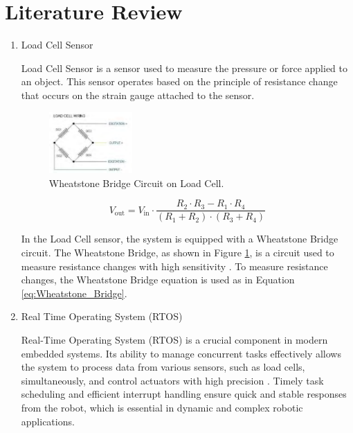 \section{Literature Review}
\label{sec:literaturereview}

\begin{enumerate}[label=\Alph*.]
    \item Load Cell Sensor
    \label{subsec:loadcellsensor}

    \hspace*{1em} Load Cell Sensor is a sensor used to measure the pressure or force applied to an object. This sensor operates based on the principle of resistance change that occurs on the strain gauge attached to the sensor.

    \begin{figure}[h]
        \centering
        \includegraphics[width=0.3\textwidth]{./gambar/wheatstone_loadcell.png}
        \caption{Wheatstone Bridge Circuit on Load Cell\cite{rahman2018autonomous}.}
        \label{fig:Wheatstone_Bridge}
    \end{figure}
    
    \begin{equation}
      V_{\mathrm{out}} = V_{\mathrm{in}} \cdot \frac{R_2 \cdot R_3 - R_1 \cdot R_4}{(R_1 + R_2) \cdot (R_3 + R_4)}
      \label{eq:Wheatstone_Bridge}
    \end{equation}
    
    \hspace*{1em} In the Load Cell sensor, the system is equipped with a Wheatstone Bridge circuit. The Wheatstone Bridge, as shown in Figure \ref{fig:Wheatstone_Bridge}, is a circuit used to measure resistance changes with high sensitivity \cite{rahman2018autonomous}. To measure resistance changes, the Wheatstone Bridge equation is used as in Equation \ref{eq:Wheatstone_Bridge}.

    \item Real Time Operating System (RTOS)
    \label{subsec:rtos}

    \hspace*{1em} Real-Time Operating System (RTOS) is a crucial component in modern embedded systems. Its ability to manage concurrent tasks effectively allows the system to process data from various sensors, such as load cells, simultaneously, and control actuators with high precision \cite{sayyad2023real}. Timely task scheduling and efficient interrupt handling ensure quick and stable responses from the robot, which is essential in dynamic and complex robotic applications.


\end{enumerate}
